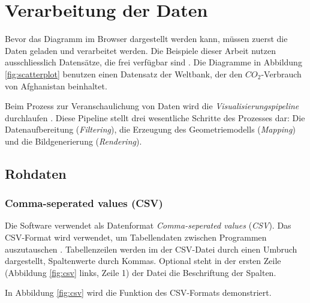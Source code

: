 \section{Verarbeitung der Daten}

Bevor das Diagramm im Browser dargestellt werden kann, müssen zuerst die Daten geladen und verarbeitet werden. Die Beispiele dieser Arbeit nutzen ausschliesslich Datensätze, die frei verfügbar sind \cite{worldbank}.  %
Die Diagramme in Abbildung \ref{fig:scatterplot} benutzen einen Datensatz der Weltbank, der den $CO_2$-Verbrauch von Afghanistan beinhaltet.

Beim Prozess zur Veranschaulichung von Daten wird die \textit{Visualisierungspipeline} durchlaufen \cite{viz}. Diese Pipeline stellt drei wesentliche Schritte des Prozesses dar: Die Datenaufbereitung (\textit{Filtering}), die Erzeugung des Geometriemodells (\textit{Mapping}) und die Bildgenerierung (\textit{Rendering}).


\subsection{Rohdaten}

\subsubsection{Comma-seperated values (CSV)}

Die Software verwendet als Datenformat \textit{Comma-seperated values} (\textit{CSV}). Das CSV-Format wird verwendet, um Tabellendaten zwischen Programmen auszutauschen \cite{csv}. Tabellenzeilen werden im der CSV-Datei durch einen Umbruch dargestellt, Spaltenwerte durch Kommas. Optional steht in der ersten Zeile (Abbildung \ref{fig:csv} links, Zeile 1) der Datei die Beschriftung der Spalten.

In Abbildung \ref{fig:csv} wird die Funktion des CSV-Formats demonstriert.

